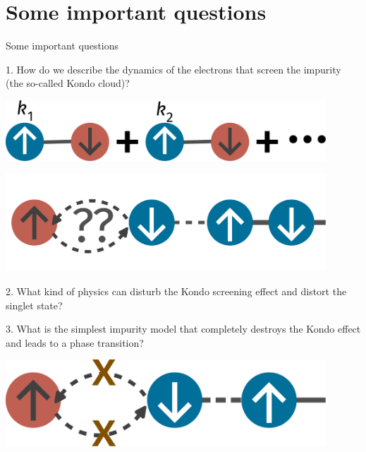 \documentclass[10pt,aspectratio=169]{beamer}
\begin{document}
\section{Some important questions}
\begin{frame}{Some important questions}
\begin{minipage}{0.45\textwidth}
	1. How do we describe the dynamics of the electrons that screen the impurity (the so-called \alert{Kondo cloud})?
\end{minipage}
\hspace*{\fill}
\begin{minipage}{0.45\textwidth}
	\includegraphics[width=0.9\textwidth]{kondocloud.pdf}
\end{minipage}
\vspace*{\fill}

\begin{minipage}{0.45\textwidth}
	\includegraphics[width=0.9\textwidth]{distortsinglet.pdf}
\end{minipage}
\hspace*{\fill}
\begin{minipage}{0.45\textwidth}
	2. What kind of physics can \alert{disturb the Kondo screening} effect and distort the singlet state?
\end{minipage}
\vspace*{\fill}

\begin{minipage}{0.45\textwidth}
	3. What is the simplest impurity model that completely destroys the Kondo effect and leads to a \alert{phase transition}?
\end{minipage}
\hspace*{\fill}
\begin{minipage}{0.45\textwidth}
	\includegraphics[width=0.9\textwidth]{kondobreakdown.pdf}
\end{minipage}
\end{frame}
\end{document}
